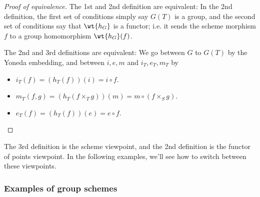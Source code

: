 %
\begin{proof}[Proof of equivalence]
The 1st and 2nd definition are equivalent: In the 2nd definition, the first set of conditions simply say $G(T)$ is a group, and the second set of conditions say that $\wt{h_G}$ is a functor; i.e. it sends the scheme morphism $f$ to a group homomorphism $\wt{h_G}(f)$.

The 2nd and 3rd definitions are equivalent: We go between $G$ to $G(T)$ by the Yoneda embedding, and between $i,e,m$ and $i_T,e_T,m_T$ by
\begin{itemize}
\item 
$i_T(f)=(h_T(f))(i)=i\circ f$.
\item
$m_T(f,g)=(h_T(f\times_T g))(m)=m\circ (f\times_S g)$.
\item
$e_T(f)=(h_T(f))(e)=e\circ f$.
\end{itemize}
\end{proof}
\vskip0.15in
The 3rd definition is the scheme viewpoint, and the 2nd definition is the functor of points viewpoint. In the following examples, we'll see how to switch between these viewpoints.

\subsubsection{Examples of group schemes}

